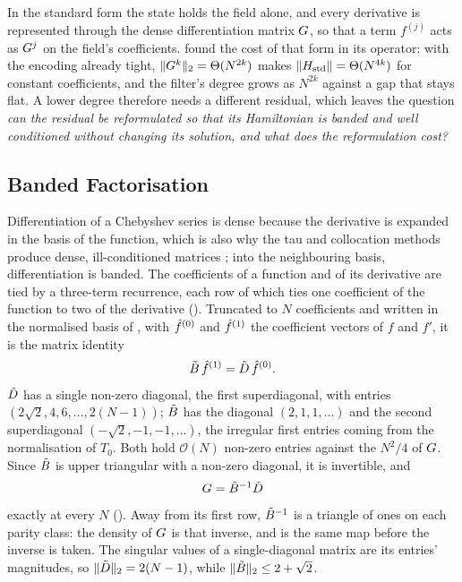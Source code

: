 In the standard form the state holds the field alone, and every derivative is represented through the dense differentiation matrix $G$, so that a term $f^{(j)}$ acts as $G^j$ on the field's coefficients.  found the cost of that form in its operator: with the encoding already tight, $\|G^k\|_2=\Theta(N^{2k})$ makes $\|H_{\mathrm{std}}\|=\Theta(N^{4k})$ for constant coefficients, and the filter's degree grows as $N^{2k}$ against a gap that stays flat. A lower degree therefore needs a different residual, which leaves the question \emph{can the residual be reformulated so that its Hamiltonian is banded and well conditioned without changing its solution, and what does the reformulation cost?}

\subsection{Banded Factorisation}
\label{sec:descriptor-construction}

Differentiation of a Chebyshev series is dense because the derivative is expanded in the basis of the function, which is also why the tau and collocation methods produce dense, ill-conditioned matrices \cite{olver2013,boyd2001Chebyshev}; into the neighbouring basis, differentiation is banded. The coefficients of a function and of its derivative are tied by a three-term recurrence, each row of which ties one coefficient of the function to two of the derivative (). Truncated to $N$ coefficients and written in the normalised basis of , with $\hat{f}^{(0)}$ and $\hat{f}^{(1)}$ the coefficient vectors of $f$ and $f'$, it is the matrix identity
\begin{equation}
    \tilde{B}\,\hat{f}^{(1)} = \tilde{D}\,\hat{f}^{(0)} .
    \label{eq:banded-factorisation}
\end{equation}
$\tilde{D}$ has a single non-zero diagonal, the first superdiagonal, with entries $(2\sqrt2,4,6,\dots,2(N-1))$; $\tilde{B}$ has the diagonal $(2,1,1,\dots)$ and the second superdiagonal $(-\sqrt2,-1,-1,\dots)$, the irregular first entries coming from the normalisation of $T_0$. Both hold $\mathcal{O}(N)$ non-zero entries against the $N^2/4$ of $G$. Since $\tilde{B}$ is upper triangular with a non-zero diagonal, it is invertible, and
\begin{equation}
    G = \tilde{B}^{-1}\tilde{D}
    \label{eq:G-banded}
\end{equation}
exactly at every $N$ (). Away from its first row, $\tilde{B}^{-1}$ is a triangle of ones on each parity class: the density of $G$ is that inverse, and  is the same map before the inverse is taken. The singular values of a single-diagonal matrix are its entries' magnitudes, so $\|\tilde{D}\|_2=2(N-1)$, while $\|\tilde{B}\|_2\le2+\sqrt2$.

